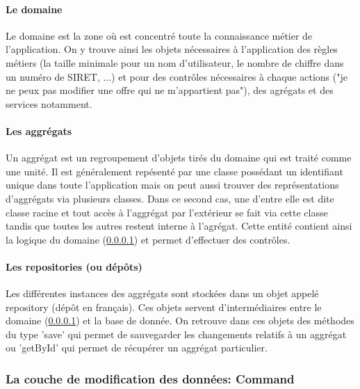 \paragraph{Le domaine}
\label{par:Le domaine}
Le domaine est la zone où est concentré toute la connaissance métier de l'application.
On y trouve ainsi les objets nécessaires à l'application des règles métiers (la taille minimale pour un nom d'utilisateur, le nombre de chiffre dans un numéro de SIRET, ...) et pour des contrôles nécessaires à chaque actions ("je ne peux pas modifier une offre qui ne m'appartient pas"), des agrégats et des services notamment.
\paragraph{Les aggrégats}
\label{par:Les aggrégats}
Un aggrégat est un regroupement d'objets tirés du domaine qui est traité comme une unité.
Il est généralement repésenté par une classe possédant un identifiant unique dans toute l'application mais on peut aussi trouver des représentations d'aggrégats via plusieurs classes.
Dans ce second cas, une d'entre elle est dite classe racine et tout accès à l'aggrégat par l'extérieur se fait via cette classe tandis que toutes les autres restent interne à l'agrégat.
Cette entité contient ainsi la logique du domaine (\ref{par:Le domaine}) et permet d'effectuer des contrôles.
\paragraph{Les repositories (ou dépôts)}
\label{par:Les repositories (ou dépôts)}
Les différentes instances des aggrégats sont stockées dans un objet appelé repository (dépôt en français).
Ces objets servent d'intermédiaires entre le domaine (\ref{par:Le domaine}) et la base de donnée.
On retrouve dans ces objets des méthodes du type 'save' qui permet de sauvegarder les changements relatifs à un aggrégat ou 'getById' qui permet de récupérer un aggrégat particulier.

\subsubsection{La couche de modification des données: Command}
\label{subs:La couche de modification des données: Command}
